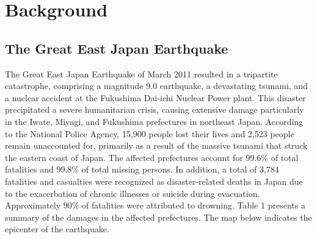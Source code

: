 \documentclass[12pt,halfline,a4paper]{ouparticle}
\begin{document}
\section{Background}
\label{sec2}

\subsection{The Great East Japan Earthquake }
\label{sec5.1}

The Great East Japan Earthquake of March 2011 resulted in a tripartite catastrophe, comprising a magnitude 9.0 earthquake, a devastating tsunami, and a nuclear accident at the Fukushima Dai-ichi Nuclear Power plant. This disaster precipitated a severe humanitarian crisis, causing extensive damage particularly in the Iwate, Miyagi, and Fukushima prefectures in northeast Japan. According to the National Police Agency, 15,900 people lost their lives and 2,523 people remain unaccounted for, primarily as a result of the
massive tsunami that struck the eastern coast of Japan. The affected
prefectures account for 99.6\% of total fatalities and 99.8\% of total missing persons. In addition, a total of 3,784 fatalities and casualties were recognized as disaster-related deaths in Japan due to the exacerbation of chronic illnesses or suicide during evacuation. Approximately 90\% of fatalities were attributed to drowning. Table 1 presents a summary of the damages in the affected prefectures. The map below indicates the epicenter of the earthquake.
\end{document}
